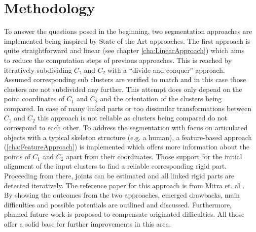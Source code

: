 \section{Methodology}

To answer the questions posed in the beginning, two segmentation approaches are implemented being inspired by State of the Art approaches. The first approach is quite straightforward and linear (see chapter \ref{cha:LinearApproach}) which aims to reduce the computation steps of previous approaches. This is reached by iteratively subdividing $C_1$ and $C_2$ with a ``divide and conquer'' approach. Assumed corresponding sub clusters are verified to match and in this case those clusters are not subdivided any further. This attempt does only depend on the point coordinates of $C_1$ and $C_2$ and the orientation of the clusters being compared. In case of many linked parts or too dissimilar transformations between $C_1$ and $C_2$ this approach is not reliable as clusters being compared do not correspond to each other. To address the segmentation with focus on articulated objects with a typical skeleton structure (e.g. a human), a feature-based approach (\ref{cha:FeatureApproach}) is implemented which offers more information about the points of $C_1$ and $C_2$ apart from their coordinates. Those support for the initial alignment of the input clusters to find a reliable corresponding rigid part. Proceeding from there, joints can be estimated and all linked rigid parts are detected iteratively. The reference paper for this approach is from Mitra et. al \cite{Mitra07}. By showing the outcomes from the two approaches, emerged drawbacks, main difficulties and possible potentials are outlined and discussed. Furthermore, planned future work is proposed to compensate originated difficulties. All those offer a solid base for further improvements in this area. 





